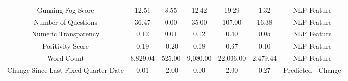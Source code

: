 \begin{longtable}{ccccccc}
Gunning-Fog Score & 12.51 & 8.55 & 12.42 & 19.29 & 1.32 & NLP Feature \\
Number of Questions & 36.47 & 0.00 & 35.00 & 107.00 & 16.38 & NLP Feature \\
Numeric Transparency & 0.12 & 0.01 & 0.12 & 0.40 & 0.05 & NLP Feature \\
Positivity Score & 0.19 & -0.20 & 0.18 & 0.67 & 0.10 & NLP Feature \\
Word Count & 8,829.04 & 525.00 & 9,080.00 & 22,006.00 & 2,479.44 & NLP Feature \\
Change Since Last Fixed Quarter Date & 0.01 & -2.00 & 0.00 & 2.00 & 0.27 & Predicted - Change \\
\end{longtable}

\normalsize